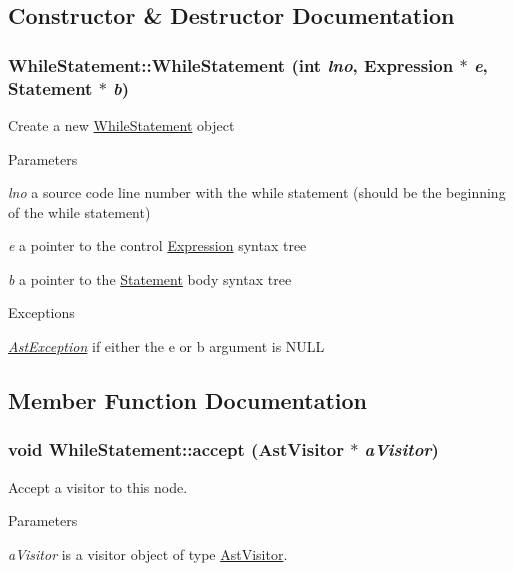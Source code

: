 \subsection{Constructor \& Destructor Documentation}
\hypertarget{classWhileStatement_ab75b71383a4c7f1c8ad103cab6f02b10}{
\subsubsection[{WhileStatement}]{\setlength{\rightskip}{0pt plus 5cm}WhileStatement::WhileStatement (int {\em lno}, \/  {\bf Expression} $\ast$ {\em e}, \/  {\bf Statement} $\ast$ {\em b})}}
\label{classWhileStatement_ab75b71383a4c7f1c8ad103cab6f02b10}
Create a new \hyperlink{classWhileStatement}{WhileStatement} object


\begin{DoxyParams}{Parameters}
\item[{\em lno}]a source code line number with the while statement (should be the beginning of the while statement) \item[{\em e}]a pointer to the control \hyperlink{classExpression}{Expression} syntax tree \item[{\em b}]a pointer to the \hyperlink{classStatement}{Statement} body syntax tree \end{DoxyParams}

\begin{DoxyExceptions}{Exceptions}
\item[{\em \hyperlink{classAstException}{AstException}}]if either the e or b argument is NULL \end{DoxyExceptions}


\subsection{Member Function Documentation}
\hypertarget{classWhileStatement_aeb7e6e61053a3e8a7b82a54c4eb8bf0d}{
\subsubsection[{accept}]{\setlength{\rightskip}{0pt plus 5cm}void WhileStatement::accept ({\bf AstVisitor} $\ast$ {\em aVisitor})}}
\label{classWhileStatement_aeb7e6e61053a3e8a7b82a54c4eb8bf0d}
Accept a visitor to this node. 
\begin{DoxyParams}{Parameters}
\item[{\em aVisitor}]is a visitor object of type \hyperlink{classAstVisitor}{AstVisitor}. \end{DoxyParams}


